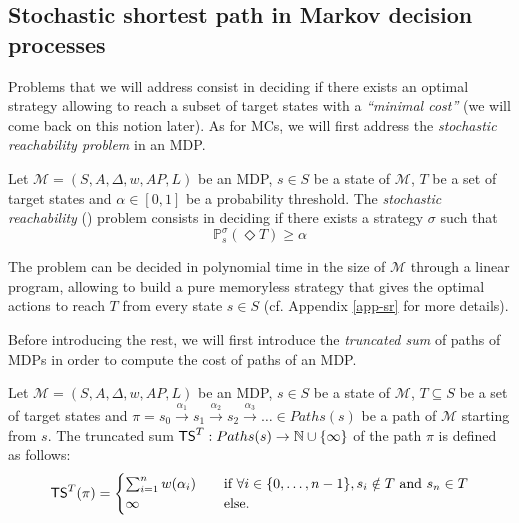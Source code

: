 \subsection{Stochastic shortest path in Markov decision processes}\label{vssp}
Problems that we will address consist in deciding if there exists an optimal strategy allowing to reach a subset of target states with a \textit{``minimal cost''} (we will come back on this notion later).
As for MCs, we will first address the \textit{stochastic reachability problem} in an MDP.
\begin{definition}
  Let $\mathcal{M}=(S, A, \Delta, w, AP, L)$ be an MDP, $s \in S$ be a state of $\mathcal{M}$, $T$ be a set of target states and $\alpha \in [0, 1]$ be
  a probability threshold. The \textit{stochastic reachability} (\SR{}) problem consists
  in deciding if there exists a strategy $\sigma$ such that
  \[
    \mathbb{P}_s^\sigma(\Diamond T) \geq \alpha
  \]
\end{definition}

\begin{theorem}\label{thm-sr}
  The \SR{} problem can be decided in polynomial time in the size of $\mathcal{M}$
  through a linear program, allowing to build a pure memoryless strategy that gives the optimal actions to reach $T$ from every state $s \in S$ (cf. Appendix \ref{app-sr} for more details).
\end{theorem}

Before introducing the rest, we will first introduce the \textit{truncated sum} of paths of MDPs in order to compute the cost of paths of an MDP.

\begin{definition}
	Let $\mathcal{M} = (S, A, \Delta, w, AP, L)$ be an MDP, $s \in S$ be a state of $\mathcal{M}$, $T \subseteq S$ be a set of target states and
	$\pi = s_0 \xrightarrow{\alpha_1} s_1 \xrightarrow{\alpha_2} s_2 \xrightarrow{\alpha_3} \dots \in Paths(s)$ be a path of
	$\mathcal{M}$ starting from $s$. The truncated sum $\text{\sffamily TS}^T: Paths(s)
	\rightarrow \mathbb{N} \cup \{\infty\}$ of the path $\pi$ is defined as follows:
	\[
		\text{\sffamily TS}^T(\pi) =
		\begin{cases}
			\sum_{i = 1}^{n} w(\alpha_i) & \quad \text{if } \forall i \in \{0, \dots, n - 1\}, s_i \notin T \text{ and } s_n \in T \\
			\infty & \quad \text{else.}
		\end{cases}
	\]

\end{definition}

